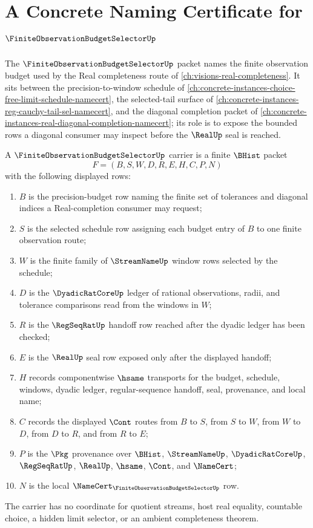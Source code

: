 \chapter{A Concrete Naming Certificate for $\FiniteObservationBudgetSelectorUp$}
\label{ch:concrete-instances-finiteobservationbudgetselector-namecert}

The $\FiniteObservationBudgetSelectorUp$ packet names the finite observation budget used by the Real completeness route of \autoref{ch:visions-real-completeness}. It sits between the precision-to-window schedule of \autoref{ch:concrete-instances-choice-free-limit-schedule-namecert}, the selected-tail surface of \autoref{ch:concrete-instances-reg-cauchy-tail-sel-namecert}, and the diagonal completion packet of \autoref{ch:concrete-instances-real-diagonal-completion-namecert}; its role is to expose the bounded rows a diagonal consumer may inspect before the $\RealUp$ seal is reached.

\begin{definition}
\label{def:finite-observation-budget-selector-carrier}
A $\FiniteObservationBudgetSelectorUp$ carrier is a finite $\BHist$ packet
$$
F=(B,S,W,D,R,E,H,C,P,N)
$$
with the following displayed rows:
\begin{enumerate}
\item $B$ is the precision-budget row naming the finite set of tolerances and diagonal indices a Real-completion consumer may request;
\item $S$ is the selected schedule row assigning each budget entry of $B$ to one finite observation route;
\item $W$ is the finite family of $\StreamNameUp$ window rows selected by the schedule;
\item $D$ is the $\DyadicRatCoreUp$ ledger of rational observations, radii, and tolerance comparisons read from the windows in $W$;
\item $R$ is the $\RegSeqRatUp$ handoff row reached after the dyadic ledger has been checked;
\item $E$ is the $\RealUp$ seal row exposed only after the displayed handoff;
\item $H$ records componentwise $\hsame$ transports for the budget, schedule, windows, dyadic ledger, regular-sequence handoff, seal, provenance, and local name;
\item $C$ records the displayed $\Cont$ routes from $B$ to $S$, from $S$ to $W$, from $W$ to $D$, from $D$ to $R$, and from $R$ to $E$;
\item $P$ is the $\Pkg$ provenance over $\BHist$, $\StreamNameUp$, $\DyadicRatCoreUp$, $\RegSeqRatUp$, $\RealUp$, $\hsame$, $\Cont$, and $\NameCert$;
\item $N$ is the local $\NameCert_{\FiniteObservationBudgetSelectorUp}$ row.
\end{enumerate}
The carrier has no coordinate for quotient streams, host real equality, countable choice, a hidden limit selector, or an ambient completeness theorem.
\end{definition}

